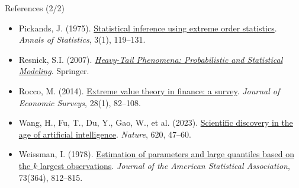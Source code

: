 \begin{frame}{References (2/2)}
\begin{itemize}
    \item Pickands, J. (1975). \href{https://doi.org/10.1214/aos/1176343003}{Statistical inference using extreme order statistics}. \textit{Annals of Statistics}, 3(1), 119--131.
    \item Resnick, S.I. (2007). \href{https://doi.org/10.1007/978-0-387-45024-7}{\textit{Heavy-Tail Phenomena: Probabilistic and Statistical Modeling}}. Springer.
    \item Rocco, M. (2014). \href{https://doi.org/10.1111/j.1467-6419.2012.00744.x}{Extreme value theory in finance: a survey}. \textit{Journal of Economic Surveys}, 28(1), 82--108.
    \item Wang, H., Fu, T., Du, Y., Gao, W., et al. (2023). \href{https://doi.org/10.1038/s41586-023-06221-2}{Scientific discovery in the age of artificial intelligence}. \textit{Nature}, 620, 47--60.
    \item Weissman, I. (1978). \href{https://doi.org/10.1080/01621459.1978.10480104}{Estimation of parameters and large quantiles based on the $k$ largest observations}. \textit{Journal of the American Statistical Association}, 73(364), 812--815.
\end{itemize}
\end{frame}



